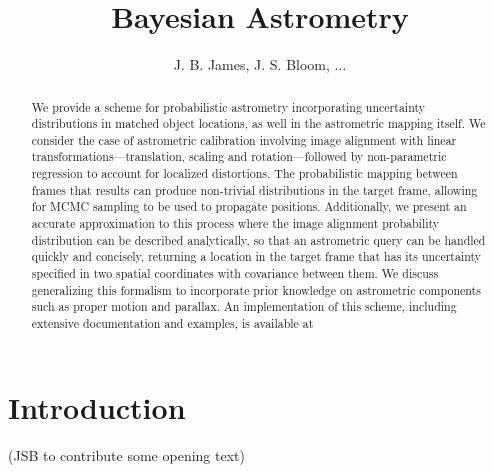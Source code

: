 \documentclass[manuscript]{aastex}
\newcommand{\asidebox}[1]{\begin{shaded}
{
\begin{picture}(0,0)(0,0)
      \put(-20,-3){\makebox(0,0){%
	  \scalebox{7}{\textcolor{quotemark}{\bfseries``}}}%
      }
    \end{picture}
   \textbf{Berian}: ``#1'' }
\end{shaded}
}
\begin{document}
\title{Bayesian Astrometry}
\author{J. B. James, J. S. Bloom, $\ldots$}

\begin{abstract}
We provide a scheme for probabilistic astrometry incorporating uncertainty distributions in matched object locations, as well in the astrometric mapping itself. We consider the case of astrometric calibration involving image alignment with linear transformations---translation, scaling and rotation---followed by non-parametric regression to account for localized distortions. The probabilistic mapping between frames that results can produce non-trivial distributions in the target frame, allowing for MCMC sampling to be used to propagate positions. Additionally, we present an accurate approximation to this process where the image alignment probability distribution can be described analytically, so that an astrometric query can be handled quickly and concisely, returning a location in the target frame that has its uncertainty specified in two spatial coordinates with covariance between them. We discuss generalizing this formalism to incorporate prior knowledge on astrometric components such as proper motion and parallax. An implementation of this scheme, including extensive documentation and examples, is available at \href{}{}%
\end{abstract}

\keywords{}

\tableofcontents

\section{Introduction}

(JSB to contribute some opening text)
\end{document}
